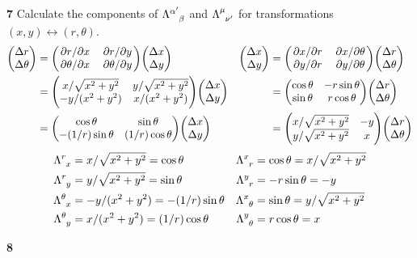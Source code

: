 \documentclass[gr-notes.tex]{subfiles}
\begin{document}
\textbf{7}
Calculate the components of $\tensor{\Lambda}{^{\alpha'}_\beta}$ and $\tensor{\Lambda}{^\mu_{\nu'}}$ for transformations $(x, y) \leftrightarrow (r, \theta)$.
~
\begin{align*}
  \mqty( \Delta r \\ \Delta \theta ) &=
  \mqty( \pdv*{r}{x}      & \pdv*{r}{y} \\
         \pdv*{\theta}{x} & \pdv*{\theta}{y} )
  \mqty( \Delta x \\ \Delta y )
  &
  \mqty( \Delta x \\ \Delta y ) &=
  \mqty( \pdv*{x}{r} & \pdv*{x}{\theta} \\
         \pdv*{y}{r} & \pdv*{y}{\theta} )
  \mqty( \Delta r \\ \Delta \theta )
  \\ &=
  \mqty( x / \sqrt{x^2+y^2} & y / \sqrt{x^2 + y^2} \\
         -y / (x^2 + y^2) & x / (x^2 + y^2) )
  \mqty( \Delta x \\ \Delta y )
  &&=
  \mqty( \cos\theta & -r \sin\theta \\
         \sin\theta &  r \cos\theta )
  \mqty( \Delta r \\ \Delta \theta )
  \\ &=
  \mqty( \cos\theta & \sin\theta \\
         -(1/r) \sin\theta & (1/r) \cos\theta )
  \mqty( \Delta x \\ \Delta y )
  &&=
  \mqty( x / \sqrt{x^2 + y^2} & -y \\
         y / \sqrt{x^2 + y^2} &  x)
  \mqty( \Delta r \\ \Delta \theta )
\end{align*}
%
\begin{align*}
  \tensor{\Lambda}{^r_x} &= x / \sqrt{x^2 + y^2} = \cos\theta
  &
  \tensor{\Lambda}{^x_r} &= \cos\theta = x / \sqrt{x^2 + y^2}
  \\
  \tensor{\Lambda}{^r_y} &= y / \sqrt{x^2 + y^2} = \sin\theta
  &
  \tensor{\Lambda}{^y_r} &= -r \sin\theta = -y
  \\
  \tensor{\Lambda}{^\theta_x} &= -y / (x^2 + y^2) = -(1/r) \sin\theta
  &
  \tensor{\Lambda}{^x_\theta} &= \sin\theta = y / \sqrt{x^2 + y^2}
  \\
  \tensor{\Lambda}{^\theta_y} &= x / (x^2 + y^2) = (1/r) \cos\theta
  &
  \tensor{\Lambda}{^y_\theta} &= r \cos\theta = x
\end{align*}



\textbf{8}
\end{document}
